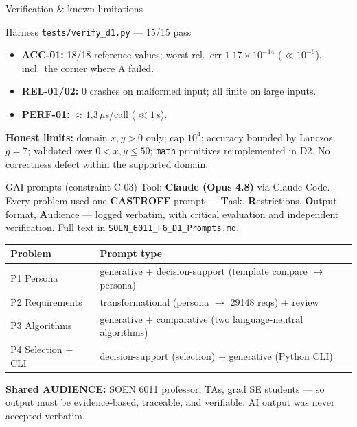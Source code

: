 \documentclass[aspectratio=169]{beamer}
\begin{document}
\begin{frame}{Verification \& known limitations}
  \begin{block}{Harness \texttt{tests/verify\_d1.py} --- 15/15 pass}
    \begin{itemize}\small
      \item \textbf{ACC-01:} 18/18 reference values; worst rel.\ err $1.17\times10^{-14}$
            ($\ll 10^{-6}$), incl.\ the corner where A failed.
      \item \textbf{REL-01/02:} 0 crashes on malformed input; all finite on large inputs.
      \item \textbf{PERF-01:} $\approx 1.3\,\mu$s/call ($\ll 1$\,s).
    \end{itemize}
  \end{block}
  \textbf{Honest limits:} domain $x,y>0$ only; cap $10^4$; accuracy bounded by Lanczos
  $g=7$; validated over $0<x,y\le50$; \texttt{math} primitives reimplemented in D2.
  No correctness defect within the supported domain.
\end{frame}

\begin{frame}{GAI prompts (constraint C-03)}
  Tool: \textbf{Claude (Opus 4.8)} via Claude Code. Every problem used one
  \textbf{CASTROFF} prompt --- \textbf{T}ask, \textbf{R}estrictions, \textbf{O}utput
  format, \textbf{A}udience --- logged verbatim, with critical evaluation and independent
  verification. Full text in \texttt{SOEN\_6011\_F6\_D1\_Prompts.md}.
  \begin{center}\footnotesize
  \begin{tabular}{@{}ll@{}}
    \toprule
    Problem & Prompt type\\
    \midrule
    P1 Persona & generative + decision-support (template compare $\rightarrow$ persona)\\
    P2 Requirements & transformational (persona $\rightarrow$ 29148 reqs) + review\\
    P3 Algorithms & generative + comparative (two language-neutral algorithms)\\
    P4 Selection + CLI & decision-support (selection) + generative (Python CLI)\\
    \bottomrule
  \end{tabular}
  \end{center}
  \footnotesize \textbf{Shared AUDIENCE:} SOEN 6011 professor, TAs, grad SE students ---
  so output must be evidence-based, traceable, and verifiable. AI output was never
  accepted verbatim.
\end{frame}
\end{document}

